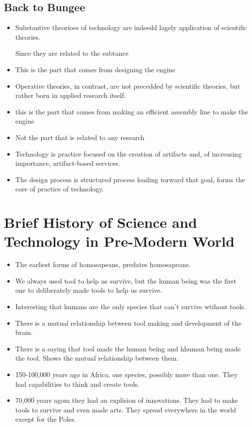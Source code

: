 \documentclass{article}
\begin{document}
\subsection{Back to Bungee}
\begin{itemize}
  \item Substantive theorioes of technology are indeedd
    lagely application of scientific theories.

    Since they are related to the subtance
  \item This is the part that comes from designing the engine
  \item Operative theories, in contrast, are not
    precedded by scientific theories, but rather
    born in applied research itself.
  \item  this is the part that comes
    from making an efficient assembly line to make
    the engine
  \item Not the part that is related to any research
  \item Technology is practice focused on the
    creation of artifacts and, of increasing importance,
    artifact-based services.
  \item The design process is structured process
    leading torward that goal, forms
    the core of practice of technology.
\end{itemize}

\section{Brief History of Science and Technology in Pre-Modern World}

\begin{itemize}
  \item The earliest forms of homosapeans, predates
    homosapeans.
  \item We always used tool to help us survive, but
    the human being was the first one to deliberately made
    tools to help us survive.
  \item Interesting that humans are the only species
    that can't survive wtihout tools.
  \item There is a mutual relationship between
    tool making and development of the brain.
  \item There is a saying that tool made the human being
    and hhuman being made the tool.
    Shows the mutual relationship between them.
  \item 150-100,000 years ago in Africa, one species,
    possibly more than one.
    They had capabilities to think and create tools.
  \item 70,000 years agom they had an explision of innovations.
    They had to make tools to survive and even made arts.
    They spread everywhere in the world except for the Poles.

\end{itemize}
\end{document}
